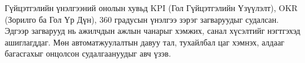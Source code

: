 Гүйцэтгэлийн үнэлгээний онолын хувьд KPI (Гол Гүйцэтгэлийн Үзүүлэлт), OKR (Зорилго ба Гол Үр Дүн), 360 градусын үнэлгээ зэрэг загваруудыг судалсан. Эдгээр загварууд нь ажилчдын ажлын чанарыг хэмжих, санал хүсэлтийг нэгтгэхэд ашиглагддаг. Мөн автоматжуулалтын давуу тал, тухайлбал цаг хэмнэх, алдааг багасгахыг онцолсон судалгаануудыг авч үзэв.